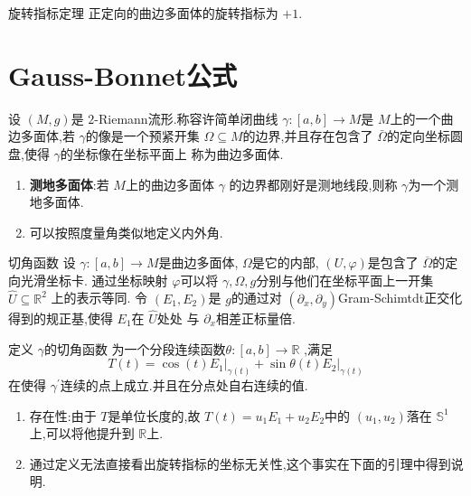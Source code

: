 \documentclass[../../几何与拓扑.tex]{subfiles}
\begin{document}
\begin{theorem}{旋转指标定理}
    正定向的曲边多面体的旋转指标为 \(  + 1  \). 
\end{theorem}

\section{Gauss-Bonnet公式}

\begin{definition}
    设 \(  \left( M,g \right)   \)是 \(  2  \)-Riemann流形.称容许简单闭曲线 \(   \gamma :\left[ a,b \right]\to M   \)是 \(  M  \)上的一个曲边多面体,若 \(   \gamma   \)的像是一个预紧开集 \(   \Omega \subseteq M  \)的边界,并且存在包含了 \(   \bar{\Omega}  \)的定向坐标圆盘,使得 \(   \gamma   \)的坐标像在坐标平面上 称为曲边多面体.    
\end{definition}
\begin{remark}
    \begin{enumerate}
        \item \textbf{测地多面体}:若 \(  M  \)上的曲边多面体 \(   \gamma   \) 的边界都刚好是测地线段,则称 \(  \gamma    \)为一个测地多面体.
        \item 可以按照度量角类似地定义内外角.  
    \end{enumerate}
    
\end{remark}

\begin{definition}{切角函数}
    设 \(   \gamma :\left[ a,b \right]\to M   \)是曲边多面体, \(   \Omega   \)是它的内部, \(  \left( U, \varphi  \right)   \)是包含了 \(  \overline{ \Omega }  \)的定向光滑坐标卡.    通过坐标映射 \(   \varphi   \)可以将 \(   \gamma , \Omega ,g  \)分别与他们在坐标平面上一开集 \(  \hat{U}\subseteq \mathbb{R} ^{2}  \) 上的表示等同.  令 \(  \left( E_1,E_2 \right)   \)是 \(  g  \)的通过对 \(  \left(  \partial _{x}, \partial _{y} \right)   \)Gram-Schimtdt正交化得到的规正基,使得 \(  E_1  \)在 \(  \hat{U}  \)处处 与 \(   \partial _{x}  \)相差正标量倍. 

    定义 \(   \gamma   \)的切角函数 为一个分段连续函数\(   \theta :\left[ a,b \right]\to \mathbb{R}    \) ,满足 \[
    T\left( t \right)= \cos \left( t \right)\left. E_1 \right|_{ \gamma \left( t \right) }+ \sin  \theta \left( t \right)\left. E_2 \right|_{ \gamma \left( t \right) }   
    \]在使得 \(   \gamma ^{\prime}   \)连续的点上成立.并且在分点处自右连续的值. 
\end{definition}
\begin{remark}
    \begin{enumerate}
        \item 存在性:由于 \(  T  \)是单位长度的,故 \(  T\left( t \right)= u_1E_1+ u_2E_2   \)中的 \(  \left( u_1,u_2 \right)   \)落在 \(  \mathbb{S}^{1}  \)上,可以将他提升到 \(  \mathbb{R}   \)上.
        \item 通过定义无法直接看出旋转指标的坐标无关性,这个事实在下面的引理中得到说明.     
    \end{enumerate}
    
\end{remark}
\end{document}
